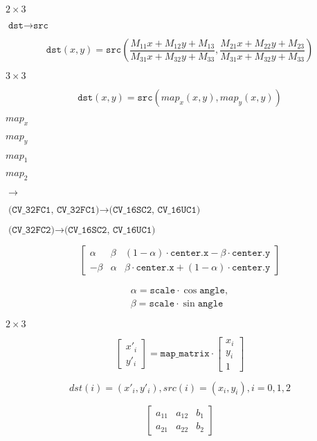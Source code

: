 \documentclass{article}
\begin{document}
$2\times 3$
\pagebreak

$\texttt{dst}\rightarrow\texttt{src}$
\pagebreak

\[\texttt{dst} (x,y) =  \texttt{src} \left ( \frac{M_{11} x + M_{12} y + M_{13}}{M_{31} x + M_{32} y + M_{33}} ,
     \frac{M_{21} x + M_{22} y + M_{23}}{M_{31} x + M_{32} y + M_{33}} \right )\]
\pagebreak

$3\times 3$
\pagebreak

\[\texttt{dst} (x,y) =  \texttt{src} (map_x(x,y),map_y(x,y))\]
\pagebreak

$map_x$
\pagebreak

$map_y$
\pagebreak

$map_1$
\pagebreak

$map_2$
\pagebreak

$\rightarrow$
\pagebreak

$\texttt{(CV\_32FC1, CV\_32FC1)} \rightarrow \texttt{(CV\_16SC2, CV\_16UC1)}$
\pagebreak

$\texttt{(CV\_32FC2)} \rightarrow \texttt{(CV\_16SC2, CV\_16UC1)}$
\pagebreak

\[\begin{bmatrix} \alpha &  \beta & (1- \alpha )  \cdot \texttt{center.x} -  \beta \cdot \texttt{center.y} \\ - \beta &  \alpha &  \beta \cdot \texttt{center.x} + (1- \alpha )  \cdot \texttt{center.y} \end{bmatrix}\]
\pagebreak

\[\begin{array}{l} \alpha =  \texttt{scale} \cdot \cos \texttt{angle} , \\ \beta =  \texttt{scale} \cdot \sin \texttt{angle} \end{array}\]
\pagebreak

$2 \times 3$
\pagebreak

\[\begin{bmatrix} x'_i \\ y'_i \end{bmatrix} = \texttt{map\_matrix} \cdot \begin{bmatrix} x_i \\ y_i \\ 1 \end{bmatrix}\]
\pagebreak

\[dst(i)=(x'_i,y'_i), src(i)=(x_i, y_i), i=0,1,2\]
\pagebreak

\[\begin{bmatrix} a_{11} & a_{12} & b_1  \\ a_{21} & a_{22} & b_2 \end{bmatrix}\]
\pagebreak
\end{document}
